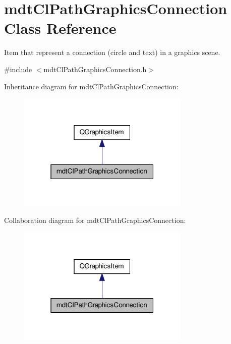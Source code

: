 \hypertarget{classmdt_cl_path_graphics_connection}{\section{mdt\-Cl\-Path\-Graphics\-Connection Class Reference}
\label{classmdt_cl_path_graphics_connection}
}


Item that represent a connection (circle and text) in a graphics scene.  




{\ttfamily \#include $<$mdt\-Cl\-Path\-Graphics\-Connection.\-h$>$}



Inheritance diagram for mdt\-Cl\-Path\-Graphics\-Connection\-:
\nopagebreak
\begin{figure}[H]
\begin{center}
\leavevmode
\includegraphics[width=232pt]{classmdt_cl_path_graphics_connection__inherit__graph}
\end{center}
\end{figure}


Collaboration diagram for mdt\-Cl\-Path\-Graphics\-Connection\-:
\nopagebreak
\begin{figure}[H]
\begin{center}
\leavevmode
\includegraphics[width=232pt]{classmdt_cl_path_graphics_connection__coll__graph}
\end{center}
\end{figure}
